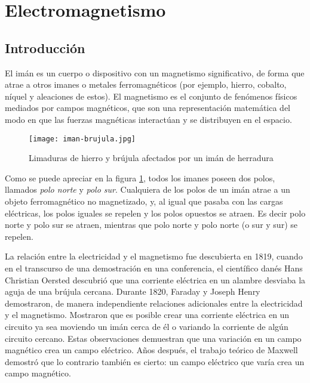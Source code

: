 \section{Electromagnetismo}

\subsection{Introducción}

El imán es un cuerpo o dispositivo con un magnetismo significativo, de forma que atrae a otros imanes o metales ferromagnéticos (por ejemplo, hierro, cobalto, níquel y aleaciones de estos). El magnetismo es el conjunto de fenómenos físicos mediados por campos magnéticos, que son una representación matemática del modo en que las fuerzas magnéticas interactúan y se distribuyen en el espacio.

\begin{figure}[ht]
  \centering
  \texttt{[image: iman-brujula.jpg]}
  \caption{Limaduras de hierro y brújula afectados por un imán de herradura}
  \label{fig:iman}
\end{figure}

Como se puede apreciar en la figura \ref{fig:iman}, todos los imanes poseen dos polos, llamados \textit{polo norte} y \textit{polo sur}. Cualquiera de los polos de un imán atrae a un objeto ferromagnético no magnetizado, y, al igual que pasaba con las cargas eléctricas, los polos iguales se repelen y los polos opuestos se atraen. Es decir polo norte y polo sur se atraen, mientras que polo norte y polo norte (o sur y sur) se repelen.

La relación entre la electricidad y el magnetismo fue descubierta en 1819, cuando en el transcurso de una demostración en una conferencia, el científico danés Hans Christian Oersted descubrió que una corriente eléctrica en un alambre desviaba la aguja de una brújula cercana. Durante 1820, Faraday y Joseph Henry demostraron, de manera independiente relaciones adicionales entre la electricidad y el magnetismo. Mostraron que es posible crear una corriente eléctrica en un circuito ya sea moviendo un imán cerca de él o variando la corriente de algún circuito cercano. Estas observaciones demuestran que una variación en un campo magnético crea un campo eléctrico. Años después, el trabajo teórico de Maxwell demostró que lo contrario también es cierto: un campo eléctrico que varía crea un campo magnético.


\clearpage





